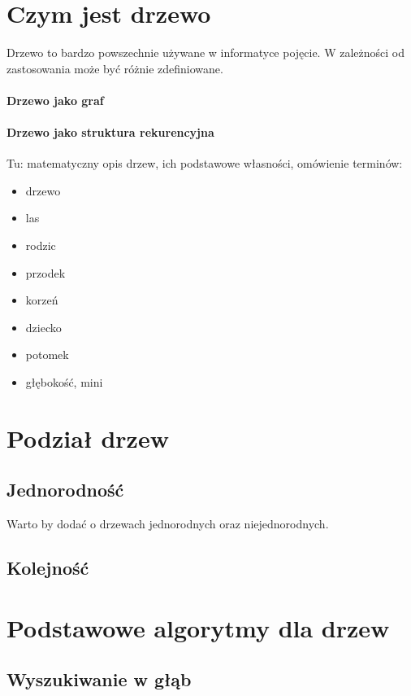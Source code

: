 \section{Czym jest drzewo}
Drzewo to bardzo powszechnie używane w informatyce pojęcie. W zależności od zastosowania może być różnie zdefiniowane.

\paragraph{Drzewo jako graf}
\paragraph{Drzewo jako struktura rekurencyjna}


Tu: matematyczny opis drzew, ich podstawowe własności, omówienie terminów:
\begin{itemize}
    \item drzewo
    \item las
    \item rodzic
    \item przodek
    \item korzeń
    \item dziecko
    \item potomek
    \item głębokość, mini
\end{itemize}

\section{Podział drzew}
\subsection{Jednorodność}
Warto by dodać o drzewach jednorodnych oraz niejednorodnych.

\subsection{Kolejność}


\section{Podstawowe algorytmy dla drzew}
\subsection{Wyszukiwanie w głąb}
